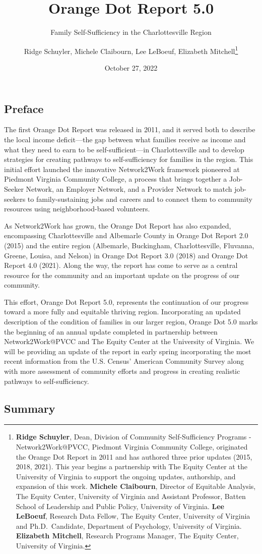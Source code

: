 \documentclass[
]{article}
\title{Orange Dot Report 5.0}
\subtitle{Family Self-Sufficiency in the Charlottesville Region}
\author{Ridge Schuyler, Michele Claibourn, Lee LeBoeuf, Elizabeth
Mitchell\footnote{\textbf{Ridge Schuyler}, Dean, Division of Community
  Self-Sufficiency Programs - Network2Work@PVCC, Piedmont Virginia
  Community College, originated the Orange Dot Report in 2011 and has
  authored three prior updates (2015, 2018, 2021). This year begins a
  partnership with The Equity Center at the University of Virginia to
  support the ongoing updates, authorship, and expansion of this work.
  \textbf{Michele Claibourn}, Director of Equitable Analysis, The Equity
  Center, University of Virginia and Assistant Professor, Batten School
  of Leadership and Public Policy, University of Virginia. \textbf{Lee
  LeBoeuf}, Research Data Fellow, The Equity Center, University of
  Virginia and Ph.D.~Candidate, Department of Psychology, University of
  Virginia. \textbf{Elizabeth Mitchell}, Research Programs Manager, The
  Equity Center, University of Virginia.}}
\date{October 27, 2022}
\begin{document}
\maketitle

\hypertarget{preface}{%
\subsection{Preface}\label{preface}}

The first Orange Dot Report was released in 2011, and it served both to
describe the local income deficit---the gap between what families
receive as income and what they need to earn to be self-sufficient---in
Charlottesville and to develop strategies for creating pathways to
self-sufficiency for families in the region. This initial effort
launched the innovative Network2Work framework pioneered at Piedmont
Virginia Community College, a process that brings together a Job-Seeker
Network, an Employer Network, and a Provider Network to match
job-seekers to family-sustaining jobs and careers and to connect them to
community resources using neighborhood-based volunteers.

As Network2Work has grown, the Orange Dot Report has also expanded,
encompassing Charlottesville and Albemarle County in Orange Dot Report
2.0 (2015) and the entire region (Albemarle, Buckingham,
Charlottesville, Fluvanna, Greene, Louisa, and Nelson) in Orange Dot
Report 3.0 (2018) and Orange Dot Report 4.0 (2021). Along the way, the
report has come to serve as a central resource for the community and an
important update on the progress of our community.

This effort, Orange Dot Report 5.0, represents the continuation of our
progress toward a more fully and equitable thriving region.
Incorporating an updated description of the condition of families in our
larger region, Orange Dot 5.0 marks the beginning of an annual update
completed in partnership between Network2Work@PVCC and The Equity Center
at the University of Virginia. We will be providing an update of the
report in early spring incorporating the most recent information from
the U.S. Census' American Community Survey along with more assessment of
community efforts and progress in creating realistic pathways to
self-sufficiency.

\hypertarget{summary}{%
\subsection{Summary}\label{summary}}
\end{document}
